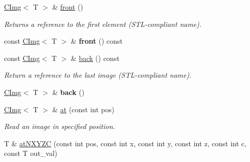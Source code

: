 \begin{DoxyCompactItemize}
\item 
\hypertarget{structcimg__library_1_1CImgList_ab2dd25806fb3e69ca6d879ec627c79bd}{
\hyperlink{structcimg__library_1_1CImg}{CImg}$<$ T $>$ \& \hyperlink{structcimg__library_1_1CImgList_ab2dd25806fb3e69ca6d879ec627c79bd}{front} ()}
\label{structcimg__library_1_1CImgList_ab2dd25806fb3e69ca6d879ec627c79bd}

\begin{DoxyCompactList}\small\item\em Returns a reference to the first element (STL-\/compliant name). \item\end{DoxyCompactList}\item 
\hypertarget{structcimg__library_1_1CImgList_a1e5183421df7cacdc5419b81e2f26342}{
const \hyperlink{structcimg__library_1_1CImg}{CImg}$<$ T $>$ \& {\bfseries front} () const }
\label{structcimg__library_1_1CImgList_a1e5183421df7cacdc5419b81e2f26342}

\item 
\hypertarget{structcimg__library_1_1CImgList_a44c4153c19437e863eda73d4bff335be}{
const \hyperlink{structcimg__library_1_1CImg}{CImg}$<$ T $>$ \& \hyperlink{structcimg__library_1_1CImgList_a44c4153c19437e863eda73d4bff335be}{back} () const }
\label{structcimg__library_1_1CImgList_a44c4153c19437e863eda73d4bff335be}

\begin{DoxyCompactList}\small\item\em Return a reference to the last image (STL-\/compliant name). \item\end{DoxyCompactList}\item 
\hypertarget{structcimg__library_1_1CImgList_a92c6578767169ed5236af0932b792738}{
\hyperlink{structcimg__library_1_1CImg}{CImg}$<$ T $>$ \& {\bfseries back} ()}
\label{structcimg__library_1_1CImgList_a92c6578767169ed5236af0932b792738}

\item 
\hypertarget{structcimg__library_1_1CImgList_aaeb0702ae0c8ed0835dcdd51480c73cd}{
\hyperlink{structcimg__library_1_1CImg}{CImg}$<$ T $>$ \& \hyperlink{structcimg__library_1_1CImgList_aaeb0702ae0c8ed0835dcdd51480c73cd}{at} (const int pos)}
\label{structcimg__library_1_1CImgList_aaeb0702ae0c8ed0835dcdd51480c73cd}

\begin{DoxyCompactList}\small\item\em Read an image in specified position. \item\end{DoxyCompactList}\item 
\hypertarget{structcimg__library_1_1CImgList_ae1344d782fd9c709aec8164c9a7a3abb}{
T \& \hyperlink{structcimg__library_1_1CImgList_ae1344d782fd9c709aec8164c9a7a3abb}{atNXYZC} (const int pos, const int x, const int y, const int z, const int c, const T out\_\-val)}
\label{structcimg__library_1_1CImgList_ae1344d782fd9c709aec8164c9a7a3abb}


\end{DoxyCompactItemize}
